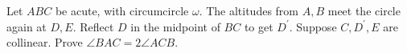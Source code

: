 Let $ABC$ be acute, with circumcircle $\omega$. The altitudes from $A,B$ meet the circle again at $D,E$. Reflect $D$ in the midpoint of $BC$ to get $D^\prime$. Suppose $C,D^\prime,E$ are collinear. Prove $\angle BAC=2\angle ACB$.
